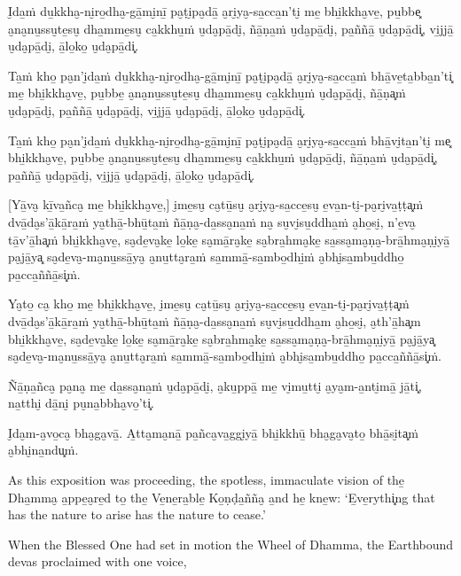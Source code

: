 I̮da̱ṁ du̱kkha̮-ni̮ro̱dha̮-gā̱mi̮nī̱ pa̮ṭi̮pa̮dā̱ a̮ri̮ya̮-sa̱cca̱n'ti̮ me̱ bhi̱kkha̮ve̱, pu̱bbe͓
a̮na̮nu̱ssu̮te̱su̮ dha̱mme̱su̮ ca̱kkhu̱ṁ u̮da̮pā̱di̮, ñā̱ṇa̱ṁ u̮da̮pā̱di̮, pa̱ññā̱ u̮da̮pā̱di͓,
vi̱jjā̱ u̮da̮pā̱di̮, ā̱lo̱ko̱ u̮da̮pā̱di͓.

Ta̱ṁ kho̱ pa̮n'i̮da̱ṁ du̱kkha̮-ni̮ro̱dha̮-gā̱mi̮nī̱ pa̮ṭi̮pa̮dā̱ a̮ri̮ya̮-sa̱cca̱ṁ bhā̱ve̱ta̱bba̱n'ti͓
me̱ bhi̱kkha̮ve̱, pu̱bbe̱ a̮na̮nu̱ssu̮te̱su̮ dha̱mme̱su̮ ca̱kkhu̱ṁ u̮da̮pā̱di̮, ñā̱ṇa͓ṁ
u̮da̮pā̱di̮, pa̱ññā̱ u̮da̮pā̱di̮, vi̱jjā̱ u̮da̮pā̱di̮, ā̱lo̱ko̱ u̮da̮pā̱di͓.

Ta̱ṁ kho̱ pa̮n'i̮da̱ṁ du̱kkha̮-ni̮ro̱dha̮-gā̱mi̮nī̱ pa̮ṭi̮pa̮dā̱ a̮ri̮ya̮-sa̱cca̱ṁ bhā̱vi̮ta̱n'ti̮ me͓
bhi̱kkha̮ve̱, pu̱bbe̱ a̮na̮nu̱ssu̮te̱su̮ dha̱mme̱su̮ ca̱kkhu̱ṁ u̮da̮pā̱di̮, ñā̱ṇa̱ṁ u̮da̮pā̱di͓,
pa̱ññā̱ u̮da̮pā̱di̮, vi̱jjā̱ u̮da̮pā̱di̮, ā̱lo̱ko̱ u̮da̮pā̱di͓.

[Yā̱va̮ kī̱va̱ñca̮ me̱ bhi̱kkha̮ve̱,] i̮me̱su̮ ca̮tū̱su̮ a̮ri̮ya̮-sa̱cce̱su̮ e̱va̱n-ti̮-pa̮ri̮va̱ṭṭa͓ṁ
dvā̱da̮s'ā̱kā̱ra̱ṁ ya̮thā̱-bhū̱ta̱ṁ ñā̱ṇa̮-da̱ssa̮na̱ṁ na̮ su̮vi̮su̱ddha̱ṁ a̮ho̱si̮, n'e̱va̮ tā̱v'ā̱ha͓ṁ
bhi̱kkha̮ve̱, sa̮de̱va̮ke̱ lo̱ke̱ sa̮mā̱ra̮ke̱ sa̮bra̱hma̮ke̱ sa̱ssa̮ma̮ṇa̮-brā̱hma̮ṇi̮yā̱ pa̮jā̱ya͓
sa̮de̱va̮-ma̮nu̱ssā̱ya̮ a̮nu̱tta̮ra̱ṁ sa̱mmā̱-sa̱mbo̱dhi̱ṁ a̮bhi̮sa̱mbu̱ddho̱ pa̱cca̱ññā̱si͓ṁ.

Ya̮to̱ ca̮ kho̱ me̱ bhi̱kkha̮ve̱, i̮me̱su̮ ca̮tū̱su̮ a̮ri̮ya̮-sa̱cce̱su̮ e̱va̱n-ti̮-pa̮ri̮va̱ṭṭa͓ṁ
dvā̱da̮s'ā̱kā̱ra̱ṁ ya̮thā̱-bhū̱ta̱ṁ ñā̱ṇa̮-da̱ssa̮na̱ṁ su̮vi̮su̱ddha̱m a̮ho̱si̮, a̮th'ā̱ha͓m
bhi̱kkha̮ve̱, sa̮de̱va̮ke̱ lo̱ke̱ sa̮mā̱ra̮ke̱ sa̮bra̱hma̮ke̱ sa̱ssa̮ma̮ṇa̮-brā̱hma̮ṇi̮yā̱ pa̮jā̱ya͓
sa̮de̱va̮-ma̮nu̱ssā̱ya̮ a̮nu̱tta̮ra̱ṁ sa̱mmā̱-sa̱mbo̱dhi̱ṁ a̮bhi̮sa̱mbu̱ddho̱ pa̱cca̱ññā̱si͓ṁ.

Ñā̱ṇa̱ñca̮ pa̮na̮ me̱ da̱ssa̮na̱ṁ u̮da̮pā̱di̮, a̮ku̱ppā̱ me̱ vi̮mu̱tti̮ a̮ya̮m-a̱nti̮mā̱ jā̱ti͓,
na̱tthi̮ dā̱ni̮ pu̮na̱bbha̮vo̱'ti͓.

I̮da̮m-a̮vo̱ca̮ bha̮ga̮vā̱. A̱tta̮ma̮nā̱ pa̱ñca̮va̱ggi̮yā̱ bhi̱kkhū̱ bha̮ga̮va̮to̱ bhā̱si̮ta͓ṁ
a̮bhi̮na̱ndu͓ṁ.

\clearpage

\englishText
\markboth{\englishTitle}{\rightmark}

As this exposition was proceeding, the spotless, immaculate vision of
the̱ Dha̱mma̮ a̱ppe̱a̮re̱d to̱ the̱ Ve̱ne̱ra̱ble̱ Ko̱ṇḍa̱ñña̮ a̱nd he̱ kne̱w: ‘E̱ve̱rythi͓ng
that has the nature to arise has the nature to cease.’

When the Blessed One had set in motion the Wheel of Dhamma, the
Earthbound devas proclaimed with one voice,

